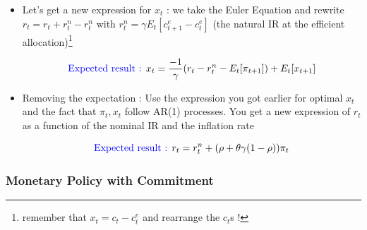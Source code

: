 \documentclass{article}
\begin{document}
\begin{itemize}
    \item Let's get a new expression for $x_t$ : we take the Euler Equation and rewrite $r_t = r_t +r_t^n-r_t^n$ with $r_t^n = \gamma E_t[c_{t+1}^e-c_t^e]$ (the natural IR at the efficient allocation)\footnote{remember that $x_t = c_t-c_t^e$ and rearrange the $c_t$s ! }
    \begin{expectedresultsbox}
    \begin{equation}
        \text{\textcolor{blue}{Expected result : }} x_t = \frac{-1}{\gamma}(r_t-r_t^n-E_t[\pi_{t+1}]) + E_t[x_{t+1}]
    \end{equation}
    \end{expectedresultsbox}
    \item Removing the expectation : Use the expression you got earlier for optimal $x_t$ and the fact that $\pi_t, x_t$ follow AR(1) processes. You get a new expression of $r_t$ as a function of the nominal IR and the inflation rate
    \begin{expectedresultsbox}
    \begin{equation}
        \text{\textcolor{blue}{Expected result : }} r_t = r_t^n+(\rho+\theta\gamma(1-\rho))\pi_t
    \end{equation}
    \end{expectedresultsbox}
\end{itemize}


\subsubsection{Monetary Policy with Commitment}
\end{document}
